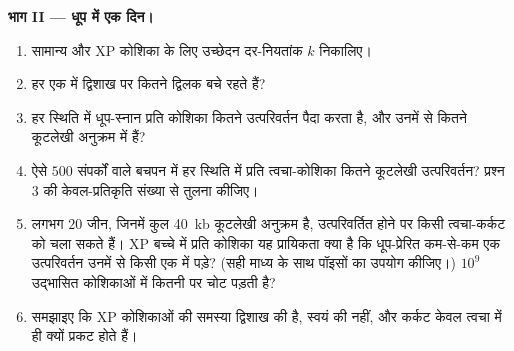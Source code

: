 \begin{problem}
\medskip
\noindent\textbf{भाग II --- धूप में एक दिन।}
\begin{enumerate}[resume]
  \item सामान्य और XP कोशिका के लिए उच्छेदन दर-नियतांक $k$ निकालिए।
  \item हर एक में द्विशाख पर कितने द्विलक बचे रहते हैं?
  \item हर स्थिति में धूप-स्नान प्रति कोशिका कितने उत्परिवर्तन पैदा
        करता है, और उनमें से कितने कूटलेखी अनुक्रम में हैं?
  \item ऐसे $500$ संपर्कों वाले बचपन में हर स्थिति में प्रति
        त्वचा-कोशिका कितने कूटलेखी उत्परिवर्तन? प्रश्न 3 की
        केवल-प्रतिकृति संख्या से तुलना कीजिए।
  \item लगभग $20$ जीन, जिनमें कुल \qty{40}{kb} कूटलेखी अनुक्रम है,
        उत्परिवर्तित होने पर किसी त्वचा-कर्कट को चला सकते हैं। XP
        बच्चे में प्रति कोशिका यह प्रायिकता क्या है कि धूप-प्रेरित
        कम-से-कम एक उत्परिवर्तन उनमें से किसी एक में पड़े? (सही माध्य
        के साथ पॉइसों का उपयोग कीजिए।) $10^{9}$ उद्भासित कोशिकाओं में
        कितनी पर चोट पड़ती है?
  \item समझाइए कि XP कोशिकाओं की समस्या द्विशाख की है, स्वयं 
        की नहीं, और कर्कट केवल त्वचा में ही क्यों प्रकट होते हैं।
\end{enumerate}


\end{problem}
